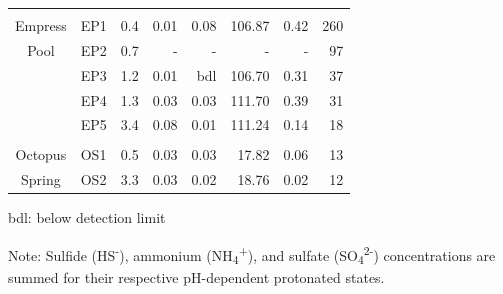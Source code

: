 {\begin{table}[htbp]
\begin{adjustbox}{width=\textwidth,keepaspectratio}
\begin{threeparttable}
\begin{tabular}{clrrrrrr}
      &       &       &       &       &       &       &  \\
Empress & EP1   & 0.4   & 0.01  & 0.08  & 106.87 & 0.42  & 260 \\
Pool  & EP2   & 0.7   & -     & -     & -     & -     & 97 \\
      & EP3   & 1.2   & 0.01  & bdl   & 106.70 & 0.31  & 37 \\
      & EP4   & 1.3   & 0.03  & 0.03  & 111.70 & 0.39  & 31 \\
      & EP5   & 3.4   & 0.08  & 0.01  & 111.24 & 0.14  & 18 \\
      &       &       &       &       &       &       &  \\
Octopus & OS1   & 0.5   & 0.03  & 0.03  & 17.82 & 0.06  & 13 \\
Spring & OS2   & 3.3   & 0.03  & 0.02  & 18.76 & 0.02  & 12 \\
\bottomrule
\end{tabular}%


	\begin{tablenotes}
      \small
      \item bdl: below detection limit
      \item Note: Sulfide (HS\textsuperscript{-}), ammonium (NH\textsubscript{4}\textsuperscript{+}), and sulfate (SO\textsubscript{4}\textsuperscript{2-}) concentrations are summed for their respective pH-dependent protonated states.
      \normalsize
    \end{tablenotes}
  \label{tab:redox}%
  \end{threeparttable}
  \end{adjustbox}
\end{table}%
\doublespace
\clearpage
}

